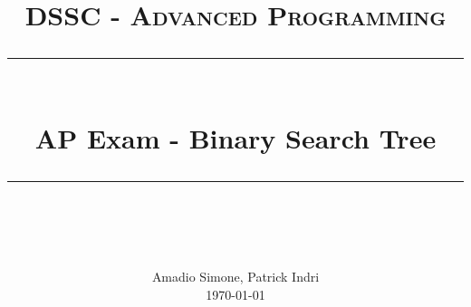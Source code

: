 \newcommand{\horrule}[1]{\rule{\linewidth}{#1}} 	%

\title{
	\normalfont \normalsize \textsc{DSSC - Advanced Programming} \\ [25pt]
	\horrule{0.5pt} \\[0.4cm]
	\huge AP Exam - Binary Search Tree \\
	\horrule{2pt} \\[0.5cm]
}
\author{
	\normalfont 								\normalsize
	Amadio Simone, Patrick Indri\\[-3pt]		\normalsize
	\today
}
\date{}

